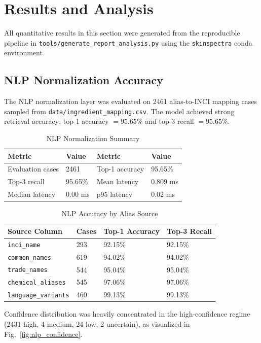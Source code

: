 \documentclass[a4paper,fleqn]{cas-sc}
\begin{document}
\section{Results and Analysis}\label{sec:results}
All quantitative results in this section were generated from the reproducible pipeline in
\texttt{tools/generate\_report\_analysis.py} using the \texttt{skinspectra} conda environment.

\subsection{NLP Normalization Accuracy}
The NLP normalization layer was evaluated on 2461 alias-to-INCI mapping cases sampled from
\texttt{data/ingredient\_mapping.csv}. The model achieved strong retrieval accuracy:
top-1 accuracy $=95.65\%$ and top-3 recall $=95.65\%$.

\begin{table}[t]
\caption{NLP Normalization Summary}
\label{tbl:nlp_summary}
\begin{tabular*}{\tblwidth}{@{}LLLL@{}}
\toprule
Metric & Value & Metric & Value \\
\midrule
Evaluation cases & 2461 & Top-1 accuracy & 95.65\% \\
Top-3 recall & 95.65\% & Mean latency & 0.809 ms \\
Median latency & 0.00 ms & p95 latency & 0.02 ms \\
\bottomrule
\end{tabular*}
\end{table}

\begin{table}[t]
\caption{NLP Accuracy by Alias Source}
\label{tbl:nlp_by_source}
\begin{tabular*}{\tblwidth}{@{}LLLL@{}}
\toprule
Source Column & Cases & Top-1 Accuracy & Top-3 Recall \\
\midrule
\texttt{inci\_name} & 293 & 92.15\% & 92.15\% \\
\texttt{common\_names} & 619 & 94.02\% & 94.02\% \\
\texttt{trade\_names} & 544 & 95.04\% & 95.04\% \\
\texttt{chemical\_aliases} & 545 & 97.06\% & 97.06\% \\
\texttt{language\_variants} & 460 & 99.13\% & 99.13\% \\
\bottomrule
\end{tabular*}
\end{table}

Confidence distribution was heavily concentrated in the high-confidence regime
(2431 high, 4 medium, 24 low, 2 uncertain), as visualized in Fig.~\ref{fig:nlp_confidence}.
\end{document}
